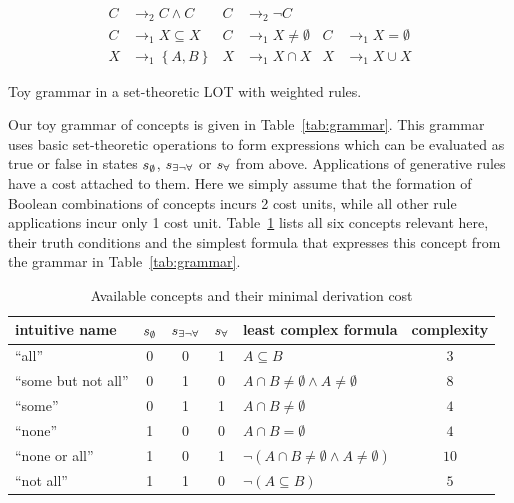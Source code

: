 \documentclass[a4paper, 11pt]{article}
\theoremstyle{Satz}
\newcommand{\set}[1]{\left\{#1\right\}}
\newcommand{\state}{\ensuremath{s}\xspace}		%
\newcommand{\mystate}[1]{\ensuremath{\state_{\text{#1}}}\xspace} %
\newcommand{\ssome}{\mystate{\ensuremath{\exists\neg\forall}}}
\newcommand{\sall}{\mystate{\ensuremath{\forall}}}
\newcommand{\snone}{\mystate{\ensuremath{\emptyset}}}
\begin{document}
\begin{table}
  \centering
  \begin{align*}
    C & \rightarrow_2 C \wedge C 
    & C & \rightarrow_2 \neg C  \\ 
    C & \rightarrow_1 X \subseteq X &
    C & \rightarrow_1 X \neq \emptyset &
    C & \rightarrow_1 X = \emptyset  \\
    X & \rightarrow_1 \set{A,B} & 
    X & \rightarrow_1 X \cap X & 
    X & \rightarrow_1 X \cup X    
  \end{align*}
  \caption{Toy grammar in a set-theoretic LOT with weighted rules.}
  \label{tab:grammar}
\end{table}

Our toy grammar of concepts is given in Table~\ref{tab:grammar}. This grammar uses basic
set-theoretic operations to form expressions which can be evaluated as true or false in states
$\snone$, $\ssome$ or $\sall$ from above. Applications of generative rules have a cost attached
to them. Here we simply assume that the formation of Boolean combinations of concepts incurs 2
cost units, while all other rule applications incur only 1 cost unit. Table~\ref{tab:concepts}
lists all six concepts relevant here, their truth conditions and the simplest formula that
expresses this concept from the grammar in Table~\ref{tab:grammar}.

\begin{table}
  \centering
\begin{center}
  \begin{tabular}{lccclc}
    \toprule
    intuitive name
    & \snone
    & \ssome
    & \sall
    & least complex formula
    & complexity
    \\ \midrule
    ``all''
    & 0
    & 0
    & 1
    & $A \subseteq B$
    & $3$
    \\
    ``some but not all''
    & 0
    & 1
    & 0
    & $A \cap B \neq \emptyset \wedge A \neq \emptyset$
    & $8$
    \\    
    ``some''
    & 0
    & 1
    & 1
    & $A \cap B \neq \emptyset$
    & $4$
    \\
    ``none''
    & 1
    & 0
    & 0
    & $A \cap B = \emptyset$
    & $4$
    \\
    ``none or all''
    & 1
    & 0
    & 1
    & $\neg(A \cap B \neq \emptyset \wedge A \neq \emptyset)$
    & $10$
    \\
    ``not all''
    & 1
    & 1
    & 0
    & $\neg (A \subseteq B)$
    & $5$
    \\
    \bottomrule
  \end{tabular}
\end{center}
\caption{Available concepts and their minimal derivation cost}
\label{tab:concepts}
\end{table}
\end{document}
